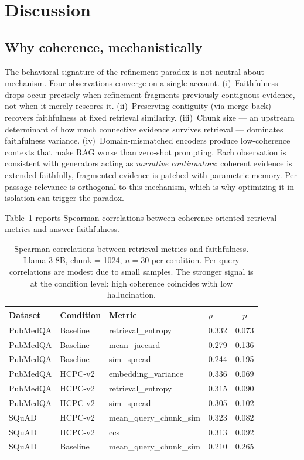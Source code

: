 \section{Discussion}
\label{sec:analysis}

\subsection{Why coherence, mechanistically}

The behavioral signature of the refinement paradox is not neutral about
mechanism. Four observations converge on a single account.
(i)~Faithfulness drops occur precisely when refinement fragments
previously contiguous evidence, not when it merely rescores it.
(ii)~Preserving contiguity (via merge-back) recovers faithfulness at
fixed retrieval similarity. (iii)~Chunk size — an upstream determinant
of how much connective evidence survives retrieval — dominates
faithfulness variance. (iv)~Domain-mismatched encoders produce
low-coherence contexts that make RAG worse than zero-shot prompting.
Each observation is consistent with generators acting as \emph{narrative
continuators}: coherent evidence is extended faithfully, fragmented
evidence is patched with parametric memory. Per-passage relevance is
orthogonal to this mechanism, which is why optimizing it in isolation
can trigger the paradox.

Table~\ref{tab:coherence_corr} reports Spearman correlations between
coherence-oriented retrieval metrics and answer faithfulness.

\begin{table}[!htb]
\centering
\caption{Spearman correlations between retrieval metrics and faithfulness.
Llama-3-8B, chunk = 1024, $n = 30$ per condition. Per-query correlations
are modest due to small samples. The stronger signal is at the condition
level: high coherence coincides with low hallucination.}
\label{tab:coherence_corr}
\footnotesize
\begin{tabular}{llllc}
\toprule
Dataset & Condition & Metric & $\rho$ & $p$ \\
\midrule
PubMedQA & Baseline & retrieval\_entropy  & 0.332 & 0.073 \\
PubMedQA & Baseline & mean\_jaccard       & 0.279 & 0.136 \\
PubMedQA & Baseline & sim\_spread         & 0.244 & 0.195 \\
\midrule
PubMedQA & HCPC-v2  & embedding\_variance & 0.336 & 0.069 \\
PubMedQA & HCPC-v2  & retrieval\_entropy  & 0.315 & 0.090 \\
PubMedQA & HCPC-v2  & sim\_spread         & 0.305 & 0.102 \\
\midrule
SQuAD    & HCPC-v2  & mean\_query\_chunk\_sim & 0.323 & 0.082 \\
SQuAD    & HCPC-v2  & ccs                     & 0.313 & 0.092 \\
SQuAD    & Baseline & mean\_query\_chunk\_sim & 0.210 & 0.265 \\
\bottomrule
\end{tabular}
\end{table}

